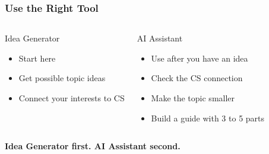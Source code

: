 \documentclass[aspectratio=169]{beamer}
\begin{document}
\begin{frame}[plain]
\frametitle{Use the Right Tool}
\begin{columns}[T,totalwidth=\textwidth]
\begin{block}{Idea Generator}
\begin{itemize}
\large
\item Start here
\item Get possible topic ideas
\item Connect your interests to CS
\end{itemize}
\end{block}
\begin{block}{AI Assistant}
\begin{itemize}
\large
\item Use after you have an idea
\item Check the CS connection
\item Make the topic smaller
\item Build a guide with 3 to 5 parts
\end{itemize}
\end{block}
\end{columns}
\vspace{0.15cm}
\begin{center}
\Large\bfseries Idea Generator first. AI Assistant second.
\end{center}
\end{frame}
\end{document}
